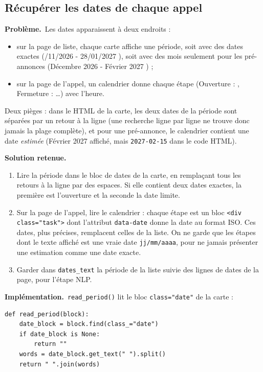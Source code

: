 \documentclass[11pt,a4paper]{article}
\newcommand{\pb}{\par\medskip\noindent\textbf{\textcolor{pbcolor}{Problème.}}\ }
\newcommand{\sol}{\par\medskip\noindent\textbf{\textcolor{solcolor}{Solution retenue.}}\ }
\newcommand{\impl}{\par\medskip\noindent\textbf{\textcolor{implcolor}{Implémentation.}}\ }
\newcommand{\code}[1]{\texttt{#1}}
\begin{document}
\subsection{Récupérer les dates de chaque appel}

\pb Les dates apparaissent à deux endroits :
\begin{itemize}
  \item sur la page de liste, chaque carte affiche une période, soit avec des dates exactes
        (/11/2026 - 28/01/2027 \fg), soit avec des mois seulement pour les pré-annonces
        (\og Décembre 2026 - Février 2027 \fg) ;
  \item sur la page de l'appel, un calendrier donne chaque étape (\og Ouverture : \fg,
        \og Fermeture : \fg\dots) avec l'heure.
\end{itemize}
Deux pièges : dans le HTML de la carte, les deux dates de la période sont séparées par un
retour à la ligne (une recherche ligne par ligne ne trouve donc jamais la plage complète),
et pour une pré-annonce, le calendrier contient une date \emph{estimée} (\og Février 2027 \fg{}
affiché, mais \code{2027-02-15} dans le code HTML).

\sol
\begin{enumerate}
  \item Lire la période dans le bloc de dates de la carte, en remplaçant tous les retours à
        la ligne par des espaces. Si elle contient deux dates exactes, la première est
        l'ouverture et la seconde la date limite.
  \item Sur la page de l'appel, lire le calendrier : chaque étape est un bloc
        \code{<div class="task">} dont l'attribut \code{data-date} donne la date au format
        ISO. Ces dates, plus précises, remplacent celles de la liste. On ne garde que les
        étapes dont le texte affiché est une vraie date \code{jj/mm/aaaa}, pour ne jamais
        présenter une estimation comme une date exacte.
  \item Garder dans \code{dates\_text} la période de la liste suivie des lignes de dates de
        la page, pour l'étape NLP.
\end{enumerate}

\impl \code{read\_period()} lit le bloc \code{class="date"} de la carte :

\begin{lstlisting}
def read_period(block):
    date_block = block.find(class_="date")
    if date_block is None:
        return ""
    words = date_block.get_text(" ").split()
    return " ".join(words)
\end{lstlisting}
\end{document}
